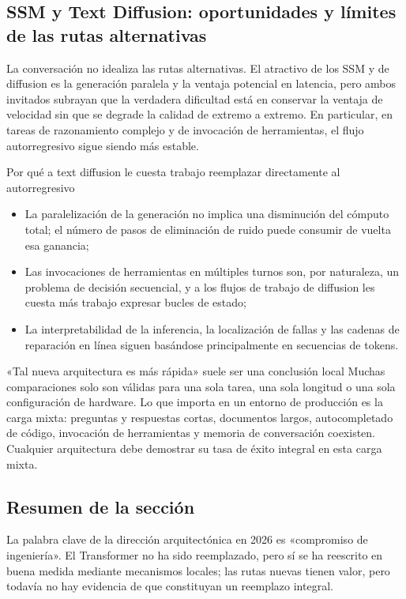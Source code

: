 \subsection{SSM y Text Diffusion: oportunidades y límites de las rutas alternativas}

La conversación no idealiza las rutas alternativas. El atractivo de los SSM y de diffusion es la generación paralela y la ventaja potencial en latencia, pero ambos invitados subrayan que la verdadera dificultad está en conservar la ventaja de velocidad sin que se degrade la calidad de extremo a extremo. En particular, en tareas de razonamiento complejo y de invocación de herramientas, el flujo autorregresivo sigue siendo más estable.

\begin{knowledgebox}{Por qué a text diffusion le cuesta trabajo reemplazar directamente al autorregresivo}
\begin{itemize}[leftmargin=1.5em]
    \item La paralelización de la generación no implica una disminución del cómputo total; el número de pasos de eliminación de ruido puede consumir de vuelta esa ganancia;
    \item Las invocaciones de herramientas en múltiples turnos son, por naturaleza, un problema de decisión secuencial, y a los flujos de trabajo de diffusion les cuesta más trabajo expresar bucles de estado;
    \item La interpretabilidad de la inferencia, la localización de fallas y las cadenas de reparación en línea siguen basándose principalmente en secuencias de tokens.
\end{itemize}
\end{knowledgebox}

\begin{warningbox}{«Tal nueva arquitectura es más rápida» suele ser una conclusión local}
Muchas comparaciones solo son válidas para una sola tarea, una sola longitud o una sola configuración de hardware. Lo que importa en un entorno de producción es la carga mixta: preguntas y respuestas cortas, documentos largos, autocompletado de código, invocación de herramientas y memoria de conversación coexisten. Cualquier arquitectura debe demostrar su tasa de éxito integral en esta carga mixta.
\end{warningbox}

\subsection{Resumen de la sección}

La palabra clave de la dirección arquitectónica en 2026 es «compromiso de ingeniería». El Transformer no ha sido reemplazado, pero sí se ha reescrito en buena medida mediante mecanismos locales; las rutas nuevas tienen valor, pero todavía no hay evidencia de que constituyan un reemplazo integral.
